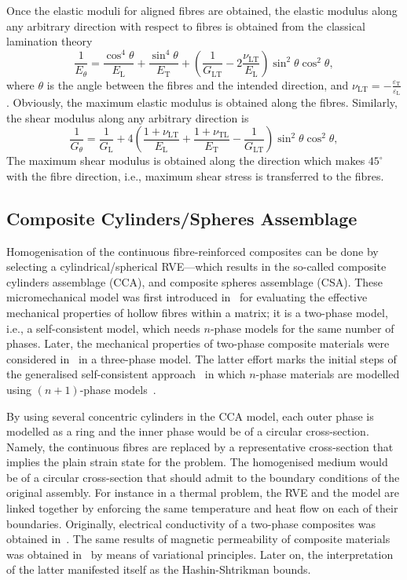     Once the elastic moduli for aligned fibres are obtained, the elastic modulus along any arbitrary direction with respect to fibres is obtained from the classical lamination theory~\autocite{Herakovich.1998}
    \begin{equation}
    	\frac{1}{E_\theta} = \frac{\cos^4\!\theta}{E_\text{L}} +\frac{\sin^4\!\theta}{E_\text{T}} + (\frac{1}{G_\text{LT}}-2\frac{\nu_\text{LT}}{E_\text{L}})\sin^2\!\theta\cos^2\!\theta,
    \end{equation}
    where $\theta$ is the angle between the fibres and the intended direction, and $\nu_\text{LT}=-\frac{\varepsilon_\text{T}}{\varepsilon_\text{L}}$. Obviously, the maximum elastic modulus is obtained along the fibres. Similarly, the shear modulus along any arbitrary direction is 
    \begin{equation}
    	\frac{1}{G_\theta} = \frac{1}{G_\text{L}} +
    	4\left(
    	 \frac{1+\nu_\text{LT}}{E_\text{L}}+
    	 \frac{1+\nu_\text{TL}}{E_\text{T}}-
    	 \frac{1}{G_\text{LT}}
    	\right)
    	\sin^2\!\theta\cos^2\!\theta,
    \end{equation}
    The maximum shear modulus is obtained along the direction which makes $45^\circ$ with the fibre direction, i.e., maximum shear stress is transferred to the fibres.

\subsection{Composite Cylinders/Spheres Assemblage}
	Homogenisation of the continuous fibre-reinforced composites can be done by selecting a cylindrical/spherical RVE---which results in the so-called composite cylinders assemblage (CCA), and composite spheres assemblage (CSA). These micromechanical model was first introduced in~\parencite{Hashin.1964} for evaluating the effective mechanical properties of hollow fibres within a matrix; it is a two-phase model, i.e., a self-consistent model, which needs $n$-phase models for the same number of phases. Later, the mechanical properties of two-phase composite materials were considered in~\parencite{Christensen.1979} in a three-phase model. The latter effort marks the initial steps of the generalised self-consistent approach~\parencite{Bohm.2020} in which $n$-phase materials are modelled using $(n+1)$-phase models~\parencite{Herve.1993}. 
	
	By using several concentric cylinders in the CCA model, each outer phase is modelled as a ring and the inner phase would be of a circular cross-section. Namely, the continuous fibres are replaced by a representative cross-section that implies the plain strain state for the problem. The homogenised medium would be of a circular cross-section that should admit to the boundary conditions of the original assembly. For instance in a thermal problem, the RVE and the model are linked together by enforcing the same temperature and heat flow on each of their boundaries. Originally, electrical conductivity of a two-phase composites was obtained in~\autocite{Kerner.1956b}. The same results of magnetic permeability of composite materials was obtained in~\autocite{Hashin.1962b} by means of variational principles. Later on, the interpretation of the latter manifested itself as the Hashin-Shtrikman bounds. 
	
